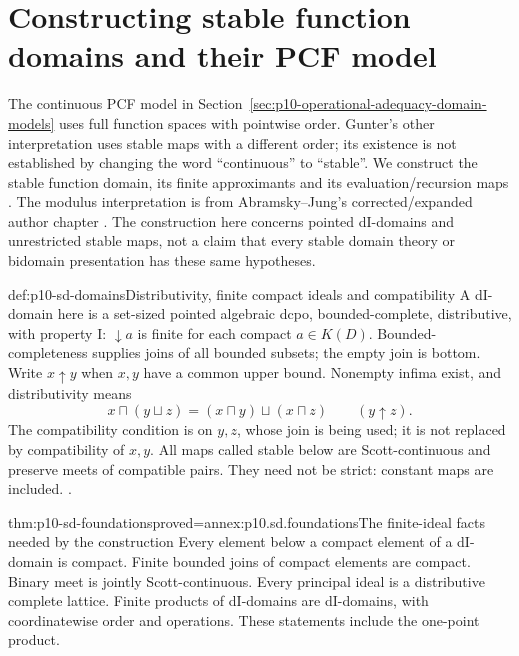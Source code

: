 \section{Constructing stable function domains and their PCF model}
\label{sec:p10-stable-domains-sequential-models}

The continuous PCF model in Section~\ref{sec:p10-operational-adequacy-domain-models}
uses full function spaces with pointwise order. Gunter's other interpretation
uses stable maps with a different order; its existence is not established by
changing the word ``continuous'' to ``stable''. We construct the stable
function domain, its finite approximants and its evaluation/recursion maps
\cite[Definitions~4.4.3--4; Lemma~4.4.5, pp.~35--36]{Gunter1994TypesAuthorOA}.
The modulus interpretation is from Abramsky--Jung's corrected/expanded
author chapter \cite[Section~8.2, p.~147]{AbramskyJungCorrectedExpandedDomainTheory}.
The construction here concerns pointed dI-domains and unrestricted stable
maps, not a claim that every stable domain theory or bidomain presentation
has these same hypotheses.

\begin{hbconvention}{def:p10-sd-domains}{Distributivity, finite compact ideals and compatibility}
A dI-domain here is a set-sized pointed algebraic dcpo, bounded-complete,
distributive, with property I: \(\downarrow a\) is finite for each
compact \(a\in K(D)\). Bounded-completeness supplies joins of all
bounded subsets; the empty join is bottom. Write \(x\mathrel{\uparrow}y\)
when \(x,y\) have a common upper bound. Nonempty infima exist, and
distributivity means
\[
 x\sqcap(y\sqcup z)=(x\sqcap y)\sqcup(x\sqcap z)
                       \qquad(y\mathrel{\uparrow}z).
\]
The compatibility condition is on \(y,z\), whose join is being used;
it is not replaced by compatibility of \(x,y\).
All maps called stable below are Scott-continuous and preserve meets of
compatible pairs. They need not be strict: constant maps are included.
\cite[pp.~35--36]{Gunter1994TypesAuthorOA}
\cite[Proposition~4.1.2, p.~56]{AbramskyJungCorrectedExpandedDomainTheory}.
\end{hbconvention}

\begin{hbtheorem}{thm:p10-sd-foundations}{proved=annex:p10.sd.foundations}{The finite-ideal facts needed by the construction}
Every element below a compact element of a dI-domain is compact.
Finite bounded joins of compact elements are compact. Binary meet is
jointly Scott-continuous. Every principal ideal is a distributive complete
lattice. Finite products of dI-domains are dI-domains, with coordinatewise
order and operations. These statements include the one-point product.
\end{hbtheorem}

